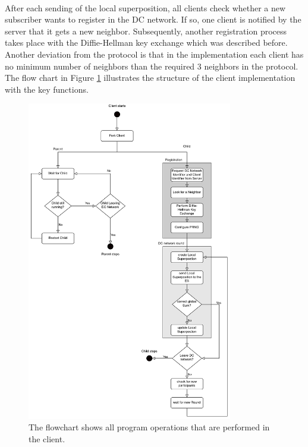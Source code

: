 \\
After each sending of the local superposition, all clients check whether a new subscriber wants to register in the DC network. If so, one client is notified by the server that it gets a new neighbor. Subsequently, another registration process takes place with the Diffie-Hellman key exchange which was described before. Another deviation from the protocol is that in the implementation each client has no minimum number of neighbors than the required 3 neighbors in the protocol. The flow chart in Figure \ref{fig:Client Implementation} illustrates the structure of the client implementation with the key functions.
\begin{figure}[tbp]
  \centering
  \includegraphics[width=0.8\textwidth]{images/Client_structure2.png}
  \caption[Flowchart Client Implementatioen]{The flowchart shows all program operations that are performed in the client.}
  \label{fig:Client Implementation}
\end{figure}

